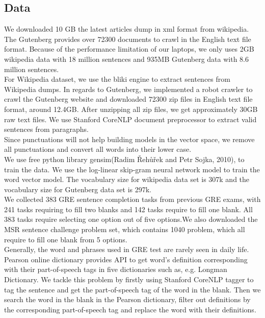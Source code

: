 \documentclass[11pt]{article}
\begin{document}
\subsection{Data}
We downloaded 10 GB the latest articles dump in xml format from wikipedia. The Gutenberg provides over 72300 documents to crawl in the English text file format. Because of the performance limitation of our laptops, we only uses 2GB wikipedia data with 18 million sentences  and 935MB Gutenberg data with 8.6 million sentences.\\
For Wikipedia dataset, we use the bliki engine to extract sentences from Wikipedia dumps. In regards to Gutenberg, we implemented a robot crawler to crawl the Gutenberg website and downloaded 72300 zip files in English text file format, around 12.4GB. After unzipping all zip files, we get approximately 30GB raw text files. We use Stanford CoreNLP document preprocessor to extract valid sentences from paragraphs. \\
Since punctuations will not help building models in the vector space, we remove all punctuations and convert all words into their lower case. \\
We use free python library gensim(Radim {\v R}eh{\r u}{\v r}ek and Petr Sojka, 2010), to train the data. We use the log-linear skip-gram neural network model to train the word vector model. The vocabulary size for wikipedia data set is 307k and the vocabulary size for Gutenberg data set is 297k.\\
We collected 383 GRE sentence completion tasks from previous GRE exams, with 241 tasks requiring to fill two blanks and 142 tasks require to fill one blank. All 383 tasks require selecting one option out of five options.We also downloaded the MSR sentence challenge problem set, which contains 1040 problem, which all require to fill one blank from 5 options.\\
Generally, the word and phrases used in GRE test are rarely seen in daily life. Pearson online dictionary provides API to get word's definition corresponding with their part-of-speech tags in five dictionaries such as, e.g. Longman Dictionary. We tackle this problem by firstly using Stanford CoreNLP tagger to tag the sentence and get the part-of-speech tag of the word in the blank. Then we search the word in the blank in the Pearson dictionary, filter out definitions by the corresponding part-of-speech tag and replace the word with their definitions. 
\end{document}
